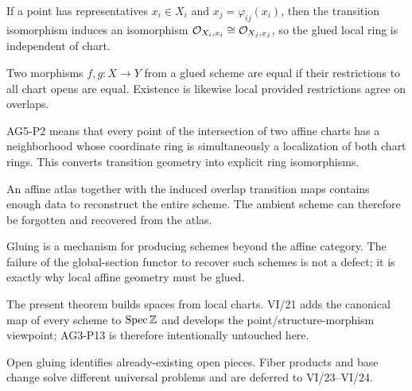 \begin{example}
If a point has representatives $x_i\in X_i$ and $x_j=\varphi_{ij}(x_i)$, then the transition isomorphism induces an isomorphism $\mathcal O_{X_i,x_i}\cong\mathcal O_{X_j,x_j}$, so the glued local ring is independent of chart.
\end{example}

\begin{example}
Two morphisms $f,g:X\to Y$ from a glued scheme are equal if their restrictions to all chart opens are equal.  Existence is likewise local provided restrictions agree on overlaps.
\end{example}

\begin{example}
AG5-P2 means that every point of the intersection of two affine charts has a neighborhood whose coordinate ring is simultaneously a localization of both chart rings.  This converts transition geometry into explicit ring isomorphisms.
\end{example}

\begin{example}
An affine atlas together with the induced overlap transition maps contains enough data to reconstruct the entire scheme.  The ambient scheme can therefore be forgotten and recovered from the atlas.
\end{example}

\begin{example}
Gluing is a mechanism for producing schemes beyond the affine category.  The failure of the global-section functor to recover such schemes is not a defect; it is exactly why local affine geometry must be glued.
\end{example}

\begin{example}
The present theorem builds spaces from local charts.  VI/21 adds the canonical map of every scheme to $\operatorname{Spec}\mathbb Z$ and develops the point/structure-morphism viewpoint; AG3-P13 is therefore intentionally untouched here.
\end{example}

\begin{example}
Open gluing identifies already-existing open pieces.  Fiber products and base change solve different universal problems and are deferred to VI/23--VI/24.
\end{example}

